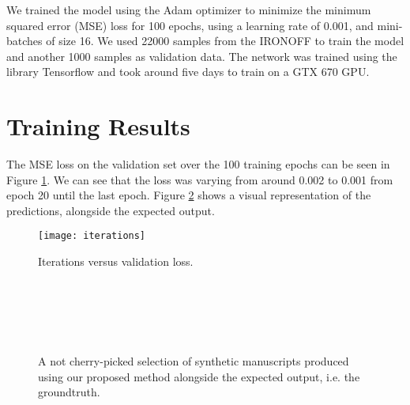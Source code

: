We trained the model using the Adam optimizer to minimize the minimum squared error (MSE) loss for 100 epochs, using a learning rate of 0.001, and mini-batches of size 16. We used 22000 samples from the IRONOFF to train the model and another 1000 samples as validation data. The network was trained using the library Tensorflow and took around five days to train on a GTX 670 GPU.

\section{Training Results}
The MSE loss on the validation set over the 100 training epochs can be seen in Figure \ref{fig:trainingMSE}. We can see that the loss was varying from around 0.002 to 0.001 from epoch 20 until the last epoch. Figure \ref{fig:resultingsamples} shows a visual representation of the predictions, alongside the expected output. 
\begin{figure}[!htb]
\centering
\texttt{[image: iterations]}

\caption{Iterations versus validation loss.}
\label{fig:trainingMSE}

\end{figure}

\begin{figure}[!htpb]
\centering
{} 
\hspace*{0.4in} %
\\
\hspace*{0.4in} %
\\
\hspace*{0.4in} %
\\
\hspace*{0.4in} %
\\
\addtocounter{subfigure}{-8}
\hspace*{0.4in} %


\caption{A not cherry-picked selection of synthetic manuscripts produced using our proposed method alongside the expected output, i.e. the groundtruth.} \label{fig:resultingsamples}
\end{figure}

